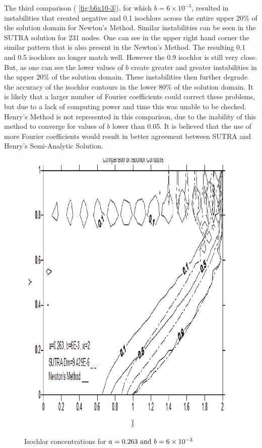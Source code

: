 The third comparison ( \autoref{fig:b6x10-3}), for which $b=6\times 10^{-3} $, resulted
in instabilities that created negative and 0.1 isochlors across the entire upper 20\% of the
solution domain for Newton's Method. Similar instabilities can be seen in the SUTRA solution for 231
nodes. One can see in the upper right hand corner the similar pattern that is also present in the
Newton's Method. The resulting 0.1 and 0.5 isochlors no longer match well.  However the 0.9 isochlor
is still very close. But, as one can see the lower values of $b$ create greater and greater
instabilities in the upper 20\% of the solution domain. These instabilities then further degrade the
accuracy of the isochlor contours in the lower 80\% of the solution domain. It is likely that a
larger number of Fourier coefficients could correct these problems, but due to a lack of computing
power and time this was unable to be checked. Henry's Method is not represented in this comparison,
due to the inability of this method to converge for values of $b$ lower than 0.05. It is believed
that the use of more Fourier coefficients would result in better agreement between SUTRA and Henry's
Semi-Analytic Solution.

\begin{figure}[htp]
    \centering
    \includegraphics[totalheight=0.45\textheight,viewport=3mm 4mm 205mm 292mm]{image4}
    \caption{Isochlor concentrations for $a = 0.263 \text{ and } b = 6 \times
    10^{-3}$} \label{fig:b6x10-3}
\end{figure}
